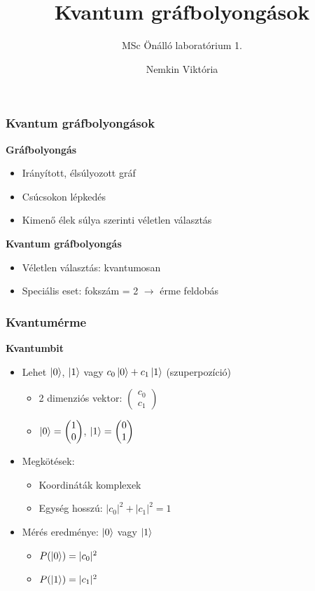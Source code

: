 \documentclass[aspectratio=169]{beamer}
\author{Nemkin Viktória}
\institute{Konzulens: dr. Friedl Katalin}
\title{Kvantum gráfbolyongások}
\subtitle{MSc Önálló laboratórium 1.}
\date{}
\begin{document}
\frame{\titlepage}

\begin{frame}
  \frametitle{Kvantum gráfbolyongások}
  \textbf{Gráfbolyongás}
  \begin{itemize}
    \item Irányított, élsúlyozott gráf
    \item Csúcsokon lépkedés
    \item Kimenő élek súlya szerinti véletlen választás
  \end{itemize}
  \pause
  \textbf{Kvantum gráfbolyongás}
  \begin{itemize}
    \item Véletlen választás: kvantumosan
    \item Speciális eset: fokszám = 2 $\rightarrow$ érme feldobás
  \end{itemize}
\end{frame}

\begin{frame}
  \frametitle{Kvantumérme}
  \textbf{Kvantumbit}
  \begin{itemize}
    \item Lehet $\ket{0}$, $\ket{1}$ vagy $c_0\ket{0} + c_1\ket{1}$ (szuperpozíció)
          \begin{itemize}
            \item 2 dimenziós vektor: $\begin{pmatrix} c_0 \\ c_1 \end{pmatrix}$
            \item $\ket{0} = \begin{pmatrix} 1 \\ 0\end{pmatrix}$, $\ket{1} = \begin{pmatrix} 0 \\ 1\end{pmatrix}$
          \end{itemize}
          \pause
    \item Megkötések:
          \begin{itemize}
            \item Koordináták komplexek
            \item Egység hosszú: $|c_0|^2 + |c_1|^2 = 1$
          \end{itemize}
          \pause
    \item Mérés eredménye: $\ket{0}$ vagy $\ket{1}$
          \begin{itemize}
            \item $P(\ket{0}) = |c_0|^2$
            \item $P(\ket{1}) = |c_1|^2$
          \end{itemize}
  \end{itemize}
\end{frame}
\end{document}
